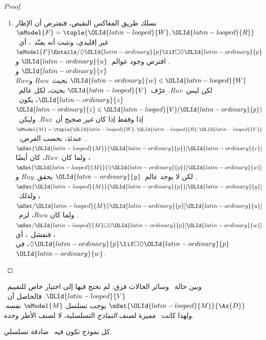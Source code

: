 \documentclass[../../../include/open-logic-section]{subfiles}
\begin{document}
\begin{proof}
\begin{enumerate}
    $\Box {\OLId{latin-ordinary}{p}} \lif \Box \Box {\OLId{latin-ordinary}{p}}$ صادقة في~${\OLId{latin-ordinary}{u}}$، فيكون
    $\mSat{{\OLId{latin-looped}{M}}}{\Box \Box {\OLId{latin-ordinary}{p}}}[{\OLId{latin-ordinary}{u}}]$. ولما كان~$Ruv$ و$Rvw$، كان
    $\mSat{{\OLId{latin-looped}{M}}}{{\OLId{latin-ordinary}{p}}}[{\OLId{latin-ordinary}{w}}]$؛ وبتعريف~${\OLId{latin-looped}{V}}$ لا يمكن هذا إلا إذا كان~$Ruw$، كما
    أُريد.
  \item نسلك طريق المعاكس النقيض، فنفترض أن الإطار
    $\mModel{F} = \tuple{{\OLId{latin-looped}{W}}, {\OLId{latin-looped}{R}}}$ غير إقليدي، ونثبت أنه يفنّد~،
    أي~$\mModel{F} \Entails/ \Diamond {\OLId{latin-ordinary}{p}} \lif \Box\Diamond {\OLId{latin-ordinary}{p}}$. افترض
    وجود عوالم~${\OLId{latin-ordinary}{u}}$ و${\OLId{latin-ordinary}{v}}$ و${\OLId{latin-ordinary}{w}} \in {\OLId{latin-looped}{W}}$ بحيث~$Rwu$ و$Rwv$ لكن ليس~$Ruv$.
    عرّف~${\OLId{latin-looped}{V}}$ بحيث، لكل عالم~${\OLId{latin-ordinary}{z}}$، يكون~${\OLId{latin-ordinary}{z}} \in {\OLId{latin-looped}{V}}({\OLId{latin-ordinary}{p}})$ إذا وفقط إذا كان
    \emph{غير} صحيح أن~$Ruz$. وليكن~$\mModel{M} =\tuple{{\OLId{latin-looped}{W}}, {\OLId{latin-looped}{R}}, {\OLId{latin-looped}{V}}}$.
    عندئذ، بحسب الفرض،~$\mSat{{\OLId{latin-looped}{M}}}{{\OLId{latin-ordinary}{p}}}[{\OLId{latin-ordinary}{v}}]$، ولما كان~$Rwv$، كان أيضًا
    $\mSat{{\OLId{latin-looped}{M}}}{\Diamond {\OLId{latin-ordinary}{p}}}[{\OLId{latin-ordinary}{w}}]$. لكن لا يوجد عالم~${\OLId{latin-ordinary}{y}}$ يحقق~$Ruy$ و
    $\mSat{{\OLId{latin-looped}{M}}}{{\OLId{latin-ordinary}{p}}}[{\OLId{latin-ordinary}{y}}]$، ولذلك~$\mSat/{{\OLId{latin-looped}{M}}}{\Diamond {\OLId{latin-ordinary}{p}}}[{\OLId{latin-ordinary}{u}}]$. ولما كان
    $Rwu$، لزم~$\mSat/{{\OLId{latin-looped}{M}}}{\Box\Diamond {\OLId{latin-ordinary}{p}}}[{\OLId{latin-ordinary}{w}}]$، فتفشل~، أي
    $\Diamond {\OLId{latin-ordinary}{p}} \lif \Box\Diamond {\OLId{latin-ordinary}{p}}$، في~${\OLId{latin-ordinary}{w}}$.
  \end{enumerate}
\end{proof}

وبين حالة~ وسائر الحالات فرق: لم نحتج فيها إلى اختيار خاص
للتقييم~${\OLId{latin-looped}{V}}$. فالحاصل أن~$\mSat{{\OLId{latin-looped}{M}}}{\Ax{D}}$ يوجب تسلسل
$\mModel{M}$ نفسه. ولهذا كانت~ مميزة لصنف \emph{النماذج}
التسلسلية، لا لصنف الأطر وحده.

\begin{cor}
  كل نموذج تكون فيه~ صادقة تسلسلي.
\end{cor}
\end{document}
